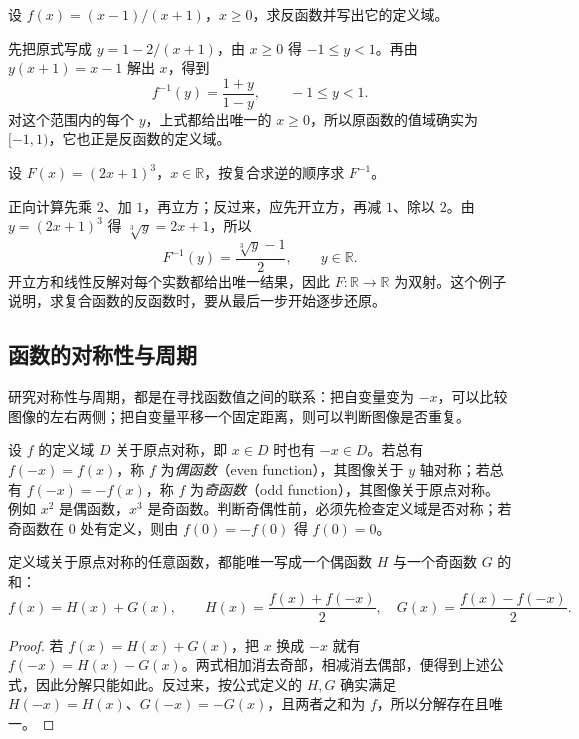 \begin{example}
\label{ex:pei-rational-inverse}
设 $f(x)=(x-1)/(x+1)$，$x\ge0$，求反函数并写出它的定义域。
\end{example}
\begin{solve}
先把原式写成 $y=1-2/(x+1)$，由 $x\ge0$ 得 $-1\le y<1$。再由 $y(x+1)=x-1$ 解出 $x$，得到
\[
    f^{-1}(y)=\frac{1+y}{1-y},\qquad -1\le y<1.
\]
对这个范围内的每个 $y$，上式都给出唯一的 $x\ge0$，所以原函数的值域确实为 $[-1,1)$，它也正是反函数的定义域。
\end{solve}

\begin{example}
\label{ex:pei-inverse-order}
设 $F(x)=(2x+1)^3$，$x\in\mathbb R$，按复合求逆的顺序求 $F^{-1}$。
\end{example}
\begin{solve}
正向计算先乘 $2$、加 $1$，再立方；反过来，应先开立方，再减 $1$、除以 $2$。由 $y=(2x+1)^3$ 得 $\sqrt[3]{y}=2x+1$，所以
\[
    F^{-1}(y)=\frac{\sqrt[3]{y}-1}{2},\qquad y\in\mathbb R.
\]
开立方和线性反解对每个实数都给出唯一结果，因此 $F:\mathbb R\to\mathbb R$ 为双射。这个例子说明，求复合函数的反函数时，要从最后一步开始逐步还原。
\end{solve}

\subsection{函数的对称性与周期}
\label{subsec:pei-symmetry-period}

研究对称性与周期，都是在寻找函数值之间的联系：把自变量变为 $-x$，可以比较图像的左右两侧；把自变量平移一个固定距离，则可以判断图像是否重复。

\begin{definition}
\label{def:pei-parity}
设 $f$ 的定义域 $D$ 关于原点对称，即 $x\in D$ 时也有 $-x\in D$。若总有 $f(-x)=f(x)$，称 $f$ 为\emph{偶函数}（even function），其图像关于 $y$ 轴对称；若总有 $f(-x)=-f(x)$，称 $f$ 为\emph{奇函数}（odd function），其图像关于原点对称。例如 $x^2$ 是偶函数，$x^3$ 是奇函数。判断奇偶性前，必须先检查定义域是否对称；若奇函数在 $0$ 处有定义，则由 $f(0)=-f(0)$ 得 $f(0)=0$。
\end{definition}

\begin{proposition}[把函数分成偶部与奇部]
\label{prop:pei-parity-decomposition}
定义域关于原点对称的任意函数，都能唯一写成一个偶函数 $H$ 与一个奇函数 $G$ 的和：
\begin{equation}
    f(x)=H(x)+G(x),\qquad
    H(x)=\frac{f(x)+f(-x)}2,\quad
    G(x)=\frac{f(x)-f(-x)}2.
    \label{eq:pei-parity-decomposition}
\end{equation}
\end{proposition}
\begin{proof}
若 $f(x)=H(x)+G(x)$，把 $x$ 换成 $-x$ 就有 $f(-x)=H(x)-G(x)$。两式相加消去奇部，相减消去偶部，便得到上述公式，因此分解只能如此。反过来，按公式定义的 $H,G$ 确实满足 $H(-x)=H(x)$、$G(-x)=-G(x)$，且两者之和为 $f$，所以分解存在且唯一。
\end{proof}

